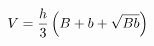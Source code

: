 \documentclass[preview]{standalone}
\begin{document}
\begin{align*}
\special{dvisvgm:raw <g id='unique000'>}V=\frac{h}{3}\left(B+b+\sqrt{Bb}\right)\special{dvisvgm:raw </g>}
\end{align*}
\end{document}
